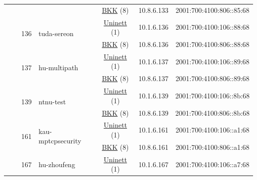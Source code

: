 \begin{small}
\begin{center}
\begin{longtable}{|c|c|c|c|c|c|c|c|}
  &  &  &  & \multicolumn{2}{|c|}{\tiny{\href{http://bkk.no}{BKK} (8)}} & \tiny{10.8.6.133} & \tiny{2001:700:4100:806::85:68} \\* \cline{3-3}\cline{4-4}\cline{5-5}\cline{6-6}\cline{7-7}\cline{8-8}
  &  & \multirow{2}{*}{\tiny{136}} & \multicolumn{1}{|l|}{\multirow{2}{*}{\tiny{tuda-sereon}}} & \multicolumn{2}{|c|}{\tiny{\href{https://www.uninett.no}{Uninett} (1)}} & \tiny{10.1.6.136} & \tiny{2001:700:4100:106::88:68} \\* \cline{5-5}\cline{6-6}\cline{7-7}\cline{8-8}
  &  &  &  & \multicolumn{2}{|c|}{\tiny{\href{http://bkk.no}{BKK} (8)}} & \tiny{10.8.6.136} & \tiny{2001:700:4100:806::88:68} \\* \cline{3-3}\cline{4-4}\cline{5-5}\cline{6-6}\cline{7-7}\cline{8-8}
  &  & \multirow{2}{*}{\tiny{137}} & \multicolumn{1}{|l|}{\multirow{2}{*}{\tiny{hu-multipath}}} & \multicolumn{2}{|c|}{\tiny{\href{https://www.uninett.no}{Uninett} (1)}} & \tiny{10.1.6.137} & \tiny{2001:700:4100:106::89:68} \\* \cline{5-5}\cline{6-6}\cline{7-7}\cline{8-8}
  &  &  &  & \multicolumn{2}{|c|}{\tiny{\href{http://bkk.no}{BKK} (8)}} & \tiny{10.8.6.137} & \tiny{2001:700:4100:806::89:68} \\* \cline{3-3}\cline{4-4}\cline{5-5}\cline{6-6}\cline{7-7}\cline{8-8}
  &  & \multirow{2}{*}{\tiny{139}} & \multicolumn{1}{|l|}{\multirow{2}{*}{\tiny{ntnu-test}}} & \multicolumn{2}{|c|}{\tiny{\href{https://www.uninett.no}{Uninett} (1)}} & \tiny{10.1.6.139} & \tiny{2001:700:4100:106::8b:68} \\* \cline{5-5}\cline{6-6}\cline{7-7}\cline{8-8}
  &  &  &  & \multicolumn{2}{|c|}{\tiny{\href{http://bkk.no}{BKK} (8)}} & \tiny{10.8.6.139} & \tiny{2001:700:4100:806::8b:68} \\* \cline{3-3}\cline{4-4}\cline{5-5}\cline{6-6}\cline{7-7}\cline{8-8}
  &  & \multirow{2}{*}{\tiny{161}} & \multicolumn{1}{|l|}{\multirow{2}{*}{\tiny{kau-mptcpsecurity}}} & \multicolumn{2}{|c|}{\tiny{\href{https://www.uninett.no}{Uninett} (1)}} & \tiny{10.1.6.161} & \tiny{2001:700:4100:106::a1:68} \\* \cline{5-5}\cline{6-6}\cline{7-7}\cline{8-8}
  &  &  &  & \multicolumn{2}{|c|}{\tiny{\href{http://bkk.no}{BKK} (8)}} & \tiny{10.8.6.161} & \tiny{2001:700:4100:806::a1:68} \\* \cline{3-3}\cline{4-4}\cline{5-5}\cline{6-6}\cline{7-7}\cline{8-8}
  &  & \multirow{2}{*}{\tiny{167}} & \multicolumn{1}{|l|}{\multirow{2}{*}{\tiny{hu-zhoufeng}}} & \multicolumn{2}{|c|}{\tiny{\href{https://www.uninett.no}{Uninett} (1)}} & \tiny{10.1.6.167} & \tiny{2001:700:4100:106::a7:68} \\* \cline{5-5}\cline{6-6}\cline{7-7}\cline{8-8}

\end{longtable}
\end{center}
\end{small}
